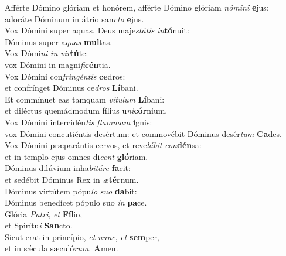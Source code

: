 \evenverse Afférte Dómino glóriam et honórem, afférte Dómino glóriam \textit{nó}\textit{mi}\textit{ni} \textbf{e}jus:~\*\\
\evenverse adoráte Dóminum in átrio san\textit{cto} \textbf{e}jus.\\
\oddverse Vox Dómini super aquas, Deus maje\textit{stá}\textit{tis} \textit{in}\textbf{tó}nuit:~\*\\
\oddverse Dóminus super a\textit{quas} \textbf{mul}tas.\\
\evenverse Vox Dómi\textit{ni} \textit{in} \textit{vir}\textbf{tú}te:~\*\\
\evenverse vox Dómini in magni\textit{fi}\textbf{cén}tia.\\
\oddverse Vox Dómini con\textit{frin}\textit{gén}\textit{tis} \textbf{ce}dros:~\*\\
\oddverse et confrínget Dóminus ce\textit{dros} \textbf{Lí}bani.\\
\evenverse Et commínuet eas tamquam \textit{ví}\textit{tu}\textit{lum} \textbf{Lí}bani:~\*\\
\evenverse et diléctus quemádmodum fílius u\textit{ni}\textbf{cór}nium.\\
\oddverse Vox Dómini intercidén\textit{tis} \textit{flam}\textit{mam} \textbf{i}gnis:~\*\\
\oddverse vox Dómini concutiéntis desértum: et commovébit Dóminus desér\textit{tum} \textbf{Ca}des.\\
\evenverse Vox Dómini præparántis cervos, et reve\textit{lá}\textit{bit} \textit{con}\textbf{dén}sa:~\*\\
\evenverse et in templo ejus omnes di\textit{cent} \textbf{gló}riam.\\
\oddverse Dóminus dilúvium inha\textit{bi}\textit{tá}\textit{re} \textbf{fa}cit:~\*\\
\oddverse et sedébit Dóminus Rex in \textit{æ}\textbf{tér}num.\\
\evenverse Dóminus virtútem pópu\textit{lo} \textit{su}\textit{o} \textbf{da}bit:~\*\\
\evenverse Dóminus benedícet pópulo suo \textit{in} \textbf{pa}ce.\\
\oddverse Glória \textit{Pa}\textit{tri}, \textit{et} \textbf{Fí}lio,~\*\\
\oddverse et Spirítu\textit{i} \textbf{San}cto.\\
\evenverse Sicut erat in princípio, \textit{et} \textit{nunc}, \textit{et} \textbf{sem}per,~\*\\
\evenverse et in sǽcula sæculó\textit{rum}. \textbf{A}men.\\
